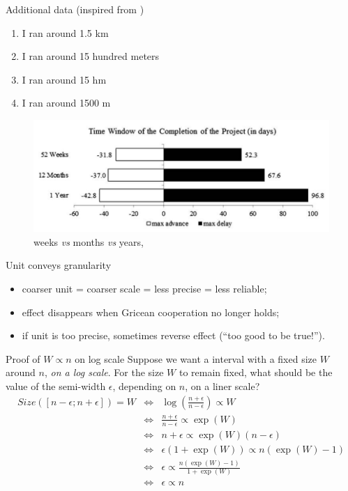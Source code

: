 \documentclass[xcolor=table, hyperref={pdfpagelabels=false}]{beamer}
\begin{document}
\begin{frame}{Additional data (inspired from \cite{Zhang2012})}
\begin{minipage}{.55\textwidth}
	\begin{enumerate}
	[square]
	\item I ran around 1.5 km
	\item I ran around 15 hundred meters
	\item I ran around 15 hm
	\item I ran around 1500 m
\end{enumerate}
\begin{figure}
	\includegraphics[width=\textwidth]{./images/zhang_data.png}
	\caption{weeks \textit{vs} months \textit{vs} years, \cite{Zhang2012}}
\end{figure}
\end{minipage}
\quad
\begin{minipage}{.4\textwidth}
	\begin{block}{Unit conveys granularity}
	\begin{itemize}
		\item coarser unit = coarser scale = less precise = less reliable;
		\item effect disappears when Gricean cooperation no longer holds;
		\item if unit is too precise, sometimes reverse effect (``too good to be true!'').
	\end{itemize}
\end{block}
\end{minipage}
\end{frame}

\begin{frame}{Proof of $W \propto n$ on log scale}
Suppose we want a interval with a fixed size $W$ around $n$, \textit{on a log scale}. For the size $W$ to remain fixed, what should be the value of the semi-width $\epsilon$, depending on $n$, on a liner scale?
\begin{eqnarray*}
	Size([n-\epsilon; n+\epsilon]) = W &\iff& \log\left(\frac{n+\epsilon}{n-\epsilon}\right) \propto W \\
	&\iff& \frac{n+\epsilon}{n-\epsilon} \propto \exp(W)\\
	&\iff& n+ \epsilon \propto \exp(W)(n-\epsilon)\\
	&\iff& \epsilon(1+\exp(W)) \propto n(\exp(W)-1)\\
	&\iff& \epsilon \propto \frac{n(\exp(W)-1)}{1+\exp(W)}\\
	&\iff& \epsilon \propto n
\end{eqnarray*}
\end{frame}
\end{document}
